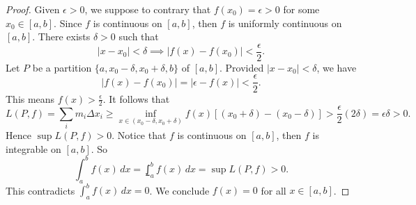 \begin{Exercise}
	\begin{proof}
		Given $\epsilon>0$, we suppose to contrary that $f(x_0) = \epsilon > 0$ for some $x_0\in[a,b]$.
		Since $f$ is continuous on $[a,b]$, then $f$ is uniformly continuous on $[a,b]$. There exists $\delta > 0$ such that
		$$
		|x-x_0| < \delta \implies |f(x) - f(x_0)| < \frac{\epsilon}{2}.
		$$
		Let $P$ be a partition $\{a, x_0-\delta, x_0+\delta, b\}$ of $[a,b]$. Provided $|x - x_0| < \delta$, we have
		$$
		|f(x)-f(x_0)| = |\epsilon - f(x) | < \frac{\epsilon}{2}.
		$$
		This means $f(x) > \frac{\epsilon}{2}$.
		It follows that
		$$
		L(P,f)
		= \sum_i m_i \Delta x_i
		\geq \inf_{x\in(x_0-\delta, x_0+\delta)} f(x) [(x_0+\delta) - (x_0-\delta)]
		> \frac{\epsilon}{2}(2\delta)
		= \epsilon \delta
		> 0.
		$$
		Hence $\sup L(P,f) > 0$.
		Notice that $f$ is continuous on $[a,b]$, then $f$ is integrable on $[a,b]$. So
		$$
		\int_{a}^{b} f(x)\,d x
		= \lowint_{a}^{b} f(x)\,d x
		= \sup L(P,f)
		> 0.
		$$
		This contradicts $\int_{a}^{b} f(x)\,dx = 0$. We conclude $
		f(x) = 0$ for all $x\in[a,b]$.
	\end{proof}
\end{Exercise}